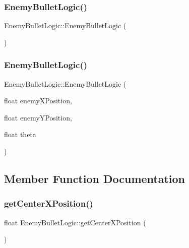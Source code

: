 \subsubsection{\texorpdfstring{Enemy\+Bullet\+Logic()}{EnemyBulletLogic()}\hspace{0.1cm}{\footnotesize\ttfamily [1/2]}}
{\footnotesize\ttfamily Enemy\+Bullet\+Logic\+::\+Enemy\+Bullet\+Logic (\begin{DoxyParamCaption}{ }\end{DoxyParamCaption})}

\mbox{\label{class_enemy_bullet_logic_a8f9f29a7c39830ccffc793adecf70c0e}} 
\subsubsection{\texorpdfstring{Enemy\+Bullet\+Logic()}{EnemyBulletLogic()}\hspace{0.1cm}{\footnotesize\ttfamily [2/2]}}
{\footnotesize\ttfamily Enemy\+Bullet\+Logic\+::\+Enemy\+Bullet\+Logic (\begin{DoxyParamCaption}\item[{float}]{enemy\+X\+Position,  }\item[{float}]{enemy\+Y\+Position,  }\item[{float}]{theta }\end{DoxyParamCaption})}



\subsection{Member Function Documentation}
\mbox{\label{class_enemy_bullet_logic_a39ffa8b7fabb84625a859691099652de}} 
\subsubsection{\texorpdfstring{get\+Center\+X\+Position()}{getCenterXPosition()}}
{\footnotesize\ttfamily float Enemy\+Bullet\+Logic\+::get\+Center\+X\+Position (\begin{DoxyParamCaption}{ }\end{DoxyParamCaption})\hspace{0.3cm}{\ttfamily [virtual]}}



